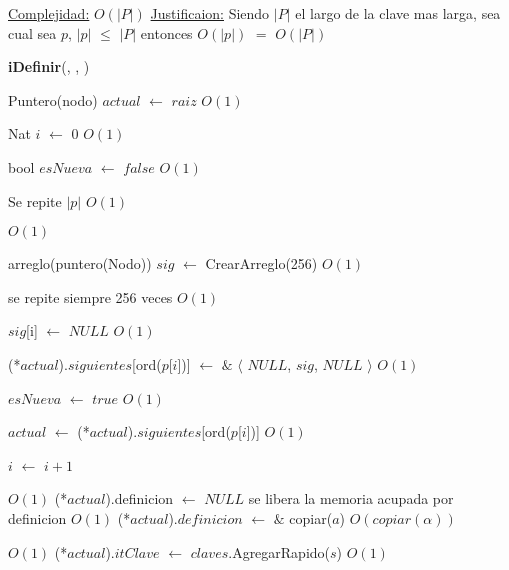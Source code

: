 \begin{Algoritmos}
\begin{algorithm}[H]
\begin{algorithmic}[1]
\medskip
\State \underline{Complejidad:} $O(|P|)$
\State \underline{Justificaion:} Siendo $|P|$ el largo de la clave mas larga, sea cual sea $p$, $|p|$ $\leq$ $|P|$ entonces 	$O(|p|)$ $=$ $O(|P|)$

\end{algorithmic}
\end{algorithm}


\begin{algorithm}[H]
{\textbf{iDefinir}(, , )}
\begin{algorithmic}[1]

\State Puntero(nodo) $actual$ $\gets$ $raiz$ \Comment $O(1)$

\State Nat $i$ $\gets$ $0$ \Comment $O(1)$

\State bool $esNueva$ $\gets$ $false$ \Comment $O(1)$

   \Comment Se repite $|p|$ $O(1)$


	 \Comment $O(1)$

		\State arreglo(puntero(Nodo)) $sig$ $\gets$ CrearArreglo(256) \Comment $O(1)$

		 \Comment se repite siempre 256 veces $O(1)$

			\State $sig$[i] $\gets$ $NULL$ \Comment $O(1)$

		\EndFor

		\State (*$actual$).$siguientes$[ord($p$[$i$])] $\gets$	 $\&$ $\langle$ $NULL$, $sig$, $NULL$ $\rangle$  \Comment $O(1)$

		\State $esNueva$ $\gets$ $true$ \Comment $O(1)$

	\EndIf

	\State $actual$ $\gets$ (*$actual$).$siguientes$[ord($p$[$i$])] \Comment $O(1)$

	\State $i$ $\gets$ $i + 1$
\EndWhile

 \Comment $O(1)$
	\State (*$actual$).definicion $\gets$ $NULL$ \Comment se libera la memoria acupada por definicion $O(1)$
\EndIf
\State (*$actual$).$definicion$ $\gets$ $\&$ copiar($a$) \Comment $O(copiar(\alpha))$

 \Comment $O(1)$
	\State (*$actual$).$itClave$ $\gets$ $claves$.AgregarRapido($s$) \Comment $O(1)$
\EndIf


\end{algorithmic}
\end{algorithm}
\end{Algoritmos}

